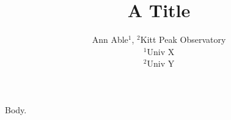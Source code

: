\documentclass{article}
\begin{document}
\title{A Title}
\author{Ann Able$^{1}$, $^{2}$Kitt Peak Observatory\\ $^1$Univ X\\ $^2$Univ Y}
\maketitle
Body.
\end{document}
